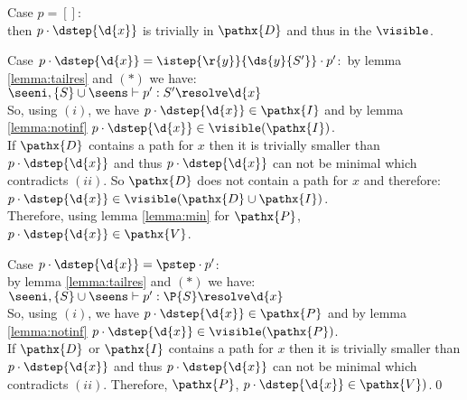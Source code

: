 \noindent Case $p = []$: \\
then $p\cdot \dstep{\d{x}}$ is trivially in $\pathx{D}$ and thus in the $\visible$.\medskip

\noindent Case $p\cdot \dstep{\d{x}} = \istep{\r{y}}{\ds{y}{S'}}\cdot p'$:\
 by lemma \ref{lemma:tailres} and $(*)$ we have:\\
\tab $\seeni,\{S\} \cup \seens \vdash p' : S' \resolve \d{x}$ \\
So, using $(i)$, we have $p \cdot \dstep{\d{x}} \in \pathx{I}$ and by lemma \ref{lemma:notinf} $p\cdot \dstep{\d{x}} \in \visible(\pathx{I})$.\\
If $\pathx{D}$ contains a path for $x$ then it is trivially smaller than $p\cdot \dstep{\d{x}}$ and thus $p\cdot \dstep{\d{x}}$ can not be minimal which contradicts $(ii)$. So $\pathx{D}$ does not contain a path for $x$ and therefore:\\
\tab $p\cdot \dstep{\d{x}} \in \visible(\pathx{D} \cup \pathx{I})$.\\
Therefore, using lemma \ref{lemma:min} for $\pathx{P}$, $p\cdot \dstep{\d{x}} \in \pathx{V}$.\medskip

\noindent Case $p\cdot \dstep{\d{x}} = \pstep\cdot p'$: \\
by lemma \ref{lemma:tailres} and $(*)$ we have:\\
\tab $\seeni,\{S\} \cup \seens \vdash p' : \P{S} \resolve \d{x}$\\
So, using $(i)$, we have $p \cdot \dstep{\d{x}} \in \pathx{P}$ and by lemma \ref{lemma:notinf} $p\cdot \dstep{\d{x}} \in \visible(\pathx{P})$.\\
If $\pathx{D}$ or $\pathx{I}$ contains a path for $x$ then it is trivially smaller than $p\cdot \dstep{\d{x}}$ and thus $p\cdot \dstep{\d{x}}$ can not be minimal which contradicts $(ii)$. 
Therefore, $\pathx{P}$, $p\cdot \dstep{\d{x}} \in \pathx{V})$.\qed \bigskip

